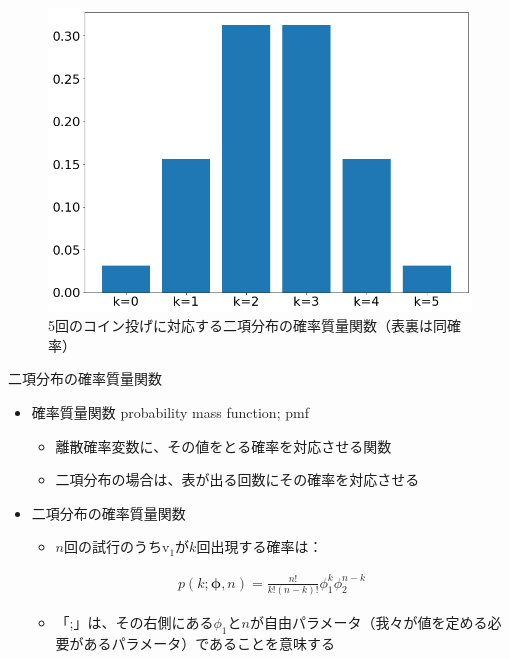 \documentclass[aspectratio=169,unicode,dvipdfmx,14pt]{beamer}
\begin{document}
\begin{frame}
\begin{figure}[htbp]
\begin{center}
\vspace{.2in}
\includegraphics[scale=0.35]{binomial_bar.png}
\caption{5回のコイン投げに対応する二項分布の確率質量関数（表裏は同確率）}
\label{}
\end{center}
\end{figure}
\end{frame}


\begin{frame}{二項分布の確率質量関数}
\begin{itemize}
\item 確率質量関数 probability mass function; pmf
\begin{itemize}
\item 離散確率変数に、その値をとる確率を対応させる関数
\item 二項分布の場合は、表が出る回数にその確率を対応させる
\end{itemize}
\item 二項分布の確率質量関数
\begin{itemize}
\item $n$回の試行のうち$\mbox{v}_1$が$k$回出現する確率は：
\end{itemize}
\begin{align}
p(k;\bm{\phi},n)=\frac{n!}{k!(n-k)!}\phi_1^k\phi_2^{n-k}
\end{align}
\begin{itemize}
\item 「;」は、その右側にある$\phi_1$と$n$が自由パラメータ（我々が値を定める必要があるパラメータ）であることを意味する
\end{itemize}
\end{itemize}
\end{frame}
\end{document}
